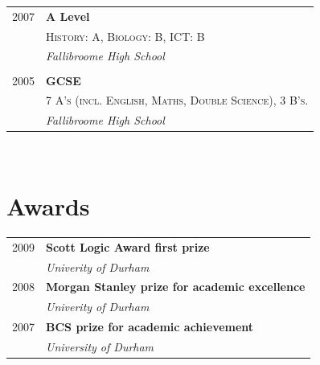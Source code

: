 \documentclass[10pt]{article} %
\begin{document}
{\begin{minipage}[t]{0.44\textwidth}
\begin{tabular}{rl}

2007 & \textbf{A Level}\\
& \textsc{History: A, Biology: B, ICT: B}\\
& \textit{Fallibroome High School}\\
&\\
	 

2005 & \textbf{GCSE}\\
& \textsc{7 A’s (incl. English, Maths, Double Science), 3 B’s.} \\
& \textit{Fallibroome High School} 
	

\end{tabular}\\[10pt]


\section{Awards} 

\begin{tabular}{rl}

2009	 & \textbf{Scott Logic Award first prize}\\
& \textit{Univerity of Durham}\\

2008	 & \textbf{Morgan Stanley prize for academic excellence}\\
& \textit{Univerity of Durham}\\

2007	 & \textbf{BCS prize for academic achievement}\\
& \textit{University of Durham}\\

\end{tabular}\\[10pt]




\end{minipage}}
\end{document}
